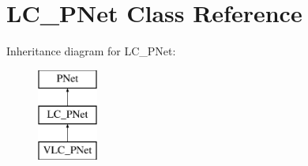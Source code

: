 \hypertarget{class_l_c___p_net}{}\section{L\+C\+\_\+\+P\+Net Class Reference}
\label{class_l_c___p_net}
Inheritance diagram for L\+C\+\_\+\+P\+Net\+:\begin{figure}[H]
\begin{center}
\leavevmode
\includegraphics[height=3.000000cm]{class_l_c___p_net}
\end{center}
\end{figure}
